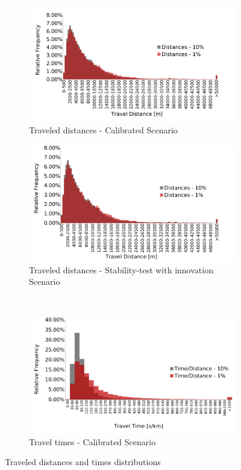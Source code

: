 \documentclass[Journal,letterpaper]{ascelike-new}
\begin{document}
\begin{figure}[h!]
	\begin{subfigure}{.5\linewidth}
		\centering
		\includegraphics[scale=.25]{images/calibratedDistancesComparison.pdf}
		\caption{Traveled distances - Calibrated Scenario}
	\end{subfigure}%
	\begin{subfigure}{.5\linewidth}
		\centering
		\includegraphics[scale=.25]{images/innovacionDistancesComparison.pdf}
		\caption{Traveled distances - Stability-test with innovation Scenario}
	\end{subfigure}\\[1ex]
	\begin{subfigure}{\linewidth}
		\centering
		\includegraphics[scale=.3]{images/calibratedTimesComparison.pdf}
		\caption{Travel times - Calibrated Scenario}
	\end{subfigure}
	\caption{Traveled distances and times distributions}
	\label{fig:times_distance_comparison}
\end{figure}
\end{document}

